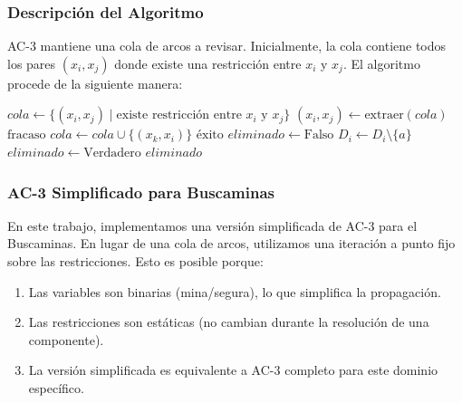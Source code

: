 \documentclass[12pt,a4paper]{article}
\begin{document}
\subsubsection{Descripción del Algoritmo}

AC-3 mantiene una cola de arcos a revisar. Inicialmente, la cola contiene todos los pares $(x_i, x_j)$ donde existe una restricción entre $x_i$ y $x_j$. El algoritmo procede de la siguiente manera:

\begin{algorithm}[H]
\caption{AC-3 estándar}
\label{alg:ac3}
\begin{algorithmic}[1]
    \State $cola \gets \{(x_i, x_j) \mid \text{existe restricción entre } x_i \text{ y } x_j\}$
        \State $(x_i, x_j) \gets \text{extraer}(cola)$
                \State \Return $\text{fracaso}$
            \EndIf
                \State $cola \gets cola \cup \{(x_k, x_i)\}$
            \EndFor
        \EndIf
    \EndWhile
    \State \Return $\text{éxito}$
\EndProcedure
\Statex
{}
    \State $eliminado \gets \text{Falso}$
            \State $D_i \gets D_i \setminus \{a\}$
            \State $eliminado \gets \text{Verdadero}$
        \EndIf
    \EndFor
    \State \Return $eliminado$
\EndProcedure
\end{algorithmic}
\end{algorithm}

\subsubsection{AC-3 Simplificado para Buscaminas}

En este trabajo, implementamos una versión simplificada de AC-3 para el Buscaminas. En lugar de una cola de arcos, utilizamos una iteración a punto fijo sobre las restricciones. Esto es posible porque:

\begin{enumerate}[itemsep=2pt]
    \item Las variables son binarias (mina/segura), lo que simplifica la propagación.
    \item Las restricciones son estáticas (no cambian durante la resolución de una componente).
    \item La versión simplificada es equivalente a AC-3 completo para este dominio específico.
\end{enumerate}
\end{document}
